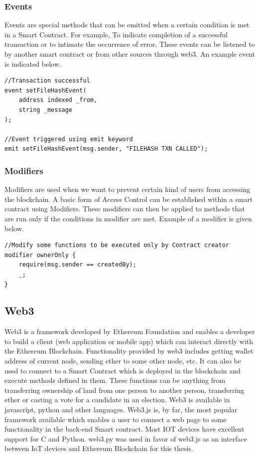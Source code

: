 \documentclass[11pt,openright]{report}
\begin{document}
\subsubsection{Events}
Events are special methods that can be emitted when a certain condition is met in a Smart Contract. For example, To indicate completion of a successful transaction or to intimate the occurrence of error. These events can be listened to by another smart contract or from other sources through web3. An example event is indicated below.
\begin{lstlisting}
//Transaction successful
event setFileHashEvent(
    address indexed _from,
    string _message
);

//Event triggered using emit keyword
emit setFileHashEvent(msg.sender, "FILEHASH TXN CALLED");
\end{lstlisting}


\subsubsection{Modifiers}
Modifiers are used when we want to prevent certain kind of users from accessing the blockchain. A basic form of Access Control can be established within a smart contract using Modifiers. These modifiers can then be applied to methods that are run only if the conditions in modifier are met. Example of a modifier is given below.
\begin{lstlisting}
//Modify some functions to be executed only by Contract creator
modifier ownerOnly {
    require(msg.sender == createdBy);
    _;
}
\end{lstlisting}


\subsection{Web3}
Web3 is a framework developed by Ethereum Foundation and enables a developer to build a client (web application or mobile app) which can interact directly with the Ethereum Blockchain. Functionality provided by web3 includes getting wallet address of current node, sending ether to some other node, etc. It can also be used to connect to a Smart Contract which is deployed in the blockchain and execute methods defined in them. These functions can be anything from transferring ownership of land from one person to another person, transferring ether or casting a vote for a candidate in an election. Web3 is available in javascript, python and other languages. Web3.js is, by far, the most popular framework available which enables a user to connect a web page to some functionality in the back-end Smart contract. Most IOT devices have excellent support for C and Python. web3.py was used in favor of web3.js as an interface between IoT devices and Ethereum Blockchain for this thesis.
\end{document}
